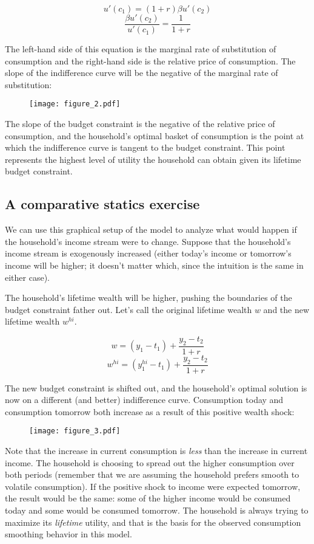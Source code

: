 \documentclass[12pt]{article}
\begin{document}
\[ u'(c_1) = (1+r)\beta u'(c_2) \]
\[ \frac{\beta u'(c_2)}{u'(c_1)} = \frac{1}{1+r} \]

The left-hand side of this equation is the marginal rate of substitution of consumption and the right-hand side is the relative price of consumption. The slope of the indifference curve will be the negative of the marginal rate of substitution:

\begin{figure}[H]
    \texttt{[image: figure\_2.pdf]}
\end{figure}

The slope of the budget constraint is the negative of the relative price of consumption, and the household's optimal basket of consumption is the point at which the indifference curve is tangent to the budget constraint. This point represents the highest level of utility the household can obtain given its lifetime budget constraint.

\subsection{A comparative statics exercise}

We can use this graphical setup of the model to analyze what would happen if the household's income stream were to change. Suppose that the household's income stream is exogenously increased (either today's income or tomorrow's income will be higher; it doesn't matter which, since the intuition is the same in either case).

The household's lifetime wealth will be higher, pushing the boundaries of the budget constraint father out. Let's call the original lifetime wealth \(w\) and the new lifetime wealth \(w^{hi}\).

\[ w = (y_1 - t_1) + \frac{y_2-t_2}{1+r} \]
\[ w^{hi} = (y_1^{hi} - t_1) + \frac{y_2-t_2}{1+r} \]

The new budget constraint is shifted out, and the household's optimal solution is now on a different (and better) indifference curve. Consumption today and consumption tomorrow both increase as a result of this positive wealth shock:

\begin{figure}[H]
    \texttt{[image: figure\_3.pdf]}
\end{figure}

Note that the increase in current consumption is \textit{less} than the increase in current income. The household is choosing to spread out the higher consumption over both periods (remember that we are assuming the household prefers smooth to volatile consumption). If the positive shock to income were expected tomorrow, the result would be the same: some of the higher income would be consumed today and some would be consumed tomorrow. The household is always trying to maximize its \textit{lifetime} utility, and that is the basis for the observed consumption smoothing behavior in this model.
\end{document}
